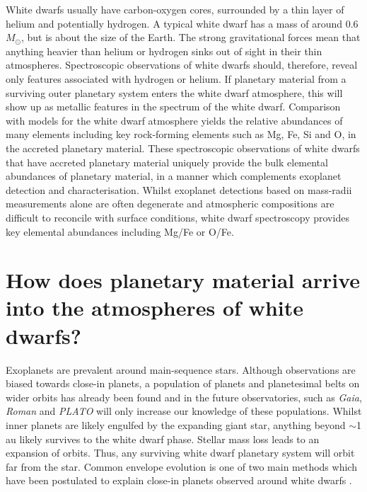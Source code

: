 \documentclass[onecolumn,authoryear]{els-mrw}
\newcommand\eg{{\it e.g.} }
\begin{document}
White dwarfs usually have carbon-oxygen cores, surrounded by a thin layer of helium and potentially hydrogen. A typical white dwarf has a mass of around 0.6$M_\odot$, but is about the size of the Earth. The strong gravitational forces mean that anything heavier than helium or hydrogen sinks out of sight in their thin atmospheres. Spectroscopic observations of white dwarfs should, therefore, reveal only features associated with hydrogen or helium.  If planetary material from a surviving outer planetary system enters the white dwarf atmosphere, this will show up as metallic features in the spectrum of the white dwarf. Comparison with models for the white dwarf atmosphere \cite[e.g.][]{Koester2010, Dufour2012} yields the relative abundances of many elements including key rock-forming elements such as Mg, Fe, Si and O, in the accreted planetary material. These spectroscopic observations of white dwarfs that have accreted planetary material uniquely provide the bulk elemental abundances of planetary material, in a manner which complements exoplanet detection and characterisation. Whilst exoplanet detections based on mass-radii measurements alone are often degenerate and atmospheric compositions are difficult to reconcile with surface conditions, white dwarf spectroscopy provides key elemental abundances including Mg/Fe or O/Fe. 




\section{How does planetary material arrive into the atmospheres of white dwarfs?}
Exoplanets are prevalent around main-sequence stars. Although observations are biased towards close-in planets, a population of planets and planetesimal belts on wider orbits has already been found and in the future observatories, such as {\it Gaia}, {\it Roman} and {\it PLATO} will only increase our knowledge of these populations. Whilst inner planets are likely engulfed by the expanding giant star, anything beyond $\sim $1 au likely survives to the white dwarf phase. Stellar mass loss leads to an expansion of orbits. Thus, any surviving white dwarf planetary system will orbit far from the star. Common envelope evolution is one of two main methods which have been postulated to explain close-in planets observed around white dwarfs \citep[\eg][]{Lagos_2020}.
\end{document}
